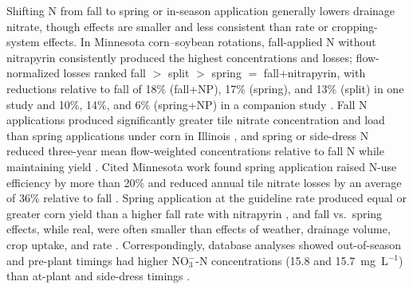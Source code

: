 Shifting N from fall to spring or in-season application generally lowers drainage nitrate, though effects are smaller and less consistent than rate or cropping-system effects. In Minnesota corn--soybean rotations, fall-applied N without nitrapyrin consistently produced the highest concentrations and losses; flow-normalized losses ranked fall $>$ split $>$ spring $=$ fall+nitrapyrin, with reductions relative to fall of 18\% (fall+NP), 17\% (spring), and 13\% (split) in one study \parencite{Randall2003} and 10\%, 14\%, and 6\% (spring+NP) in a companion study \parencite{Randall2005}. Fall N applications produced significantly greater tile nitrate concentration and load than spring applications under corn in Illinois \parencite{Gentry2024}, and spring or side-dress N reduced three-year mean flow-weighted concentrations relative to fall N while maintaining yield \parencite{Pittelkow2017}. Cited Minnesota work found spring application raised N-use efficiency by more than 20\% and reduced annual tile nitrate losses by an average of 36\% relative to fall \parencite{Dinnes2002}. Spring application at the guideline rate produced equal or greater corn yield than a higher fall rate with nitrapyrin \parencite{Vetsch2019}, and fall vs.\ spring effects, while real, were often smaller than effects of weather, drainage volume, crop uptake, and rate \parencite{Liu2021}. Correspondingly, database analyses showed out-of-season and pre-plant timings had higher NO$_3^-$-N concentrations (15.8 and 15.7~mg~L$^{-1}$) than at-plant and side-dress timings \parencite{Hertzberger2019}.

